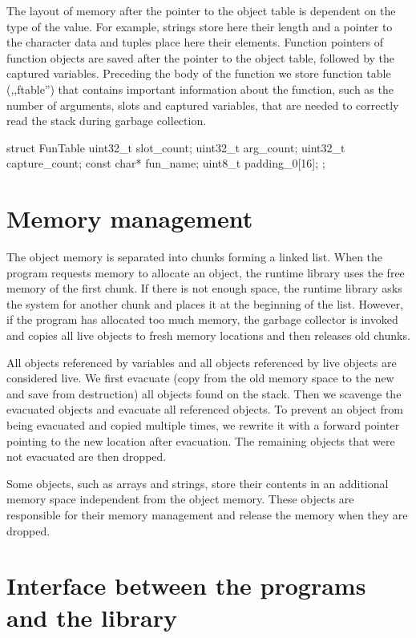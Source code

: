 The layout of memory after the pointer to the object table is dependent on the
type of the value. For example, strings store here their length and a pointer to the
character data and tuples place here their elements. Function pointers of
function objects are saved after the pointer to the object table, followed by
the captured variables. Preceding the
body of the function we store function table (,,ftable'') that contains
important information about the function, such as the number of arguments, slots
and captured variables, that are needed to correctly read the stack during
garbage collection.

\begin{cplusplus}
  struct FunTable {
    uint32_t slot_count;
    uint32_t arg_count;
    uint32_t capture_count;
    const char* fun_name;
    uint8_t padding_0[16];
  };
\end{cplusplus}

\section{Memory management}

The object memory is separated into chunks forming a linked list. When the
program requests memory to allocate an object, the runtime library uses the
free memory of the first chunk. If there is not enough space, the runtime
library asks the system for another chunk and places it at the beginning of the
list. However, if the program has allocated too much memory, the garbage
collector is invoked and copies all live objects to fresh memory
locations and then releases old chunks.

All objects referenced by variables and all objects referenced by live objects
are considered live. We first evacuate (copy from the old memory space to the
new and save from destruction) all objects found on the stack. Then we scavenge
the evacuated objects and evacuate all referenced objects. To prevent an object
from being evacuated and copied multiple times, we rewrite it with a forward
pointer pointing to the new location after evacuation. The remaining objects
that were not evacuated are then dropped.

Some objects, such as arrays and strings, store their contents in an additional
memory space independent from the object memory. These objects are responsible
for their memory management and release the memory when they are dropped.

\section{Interface between the programs and the library}

